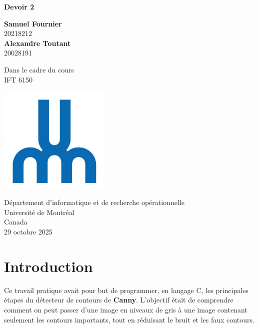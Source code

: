 \documentclass{article}
\begin{document}
\begin{titlepage}
	\begin{center}
		\vspace*{1cm}

		\Huge
		\textbf{Devoir 2}

		\vspace{0.5cm}
		\LARGE

		\vspace{1.5cm}

        
		\textbf{Samuel Fournier}\\20218212 \\
		\vfill
		\textbf{Alexandre Toutant}\\20028191 \\
		\vfill


		Dans le cadre du cours\\
		IFT 6150


		\vspace{0.8cm}

		\includegraphics[width=0.4\textwidth]{udem.jpg}

		\Large
		Département d'informatique et de recherche opérationnelle\\
		Université de Montréal\\
		Canada\\
		29 octobre 2025

	\end{center}
\end{titlepage}
\section*{Introduction}

Ce travail pratique avait pour but de programmer, en langage C, les principales étapes du détecteur de contours de \textbf{Canny}.  
L'objectif était de comprendre comment on peut passer d'une image en niveaux de gris à une image contenant seulement les contours importants, tout en réduisant le bruit et les faux contours.
\end{document}
